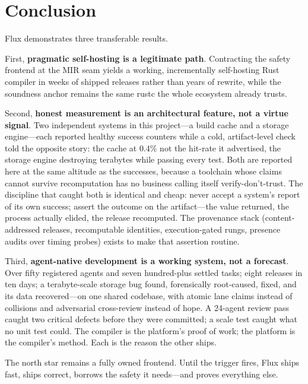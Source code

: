 \section{Conclusion}

Flux demonstrates three transferable results.

First, \textbf{pragmatic self-hosting is a legitimate path}. Contracting the safety frontend at the MIR seam yields a working, incrementally self-hosting Rust compiler in weeks of shipped releases rather than years of rewrite, while the soundness anchor remains the same rustc the whole ecosystem already trusts.

Second, \textbf{honest measurement is an architectural feature, not a virtue signal}. Two independent systems in this project---a build cache and a storage engine---each reported healthy success counters while a cold, artifact-level check told the opposite story: the cache at 0.4\% not the hit-rate it advertised, the storage engine destroying terabytes while passing every test. Both are reported here at the same altitude as the successes, because a toolchain whose claims cannot survive recomputation has no business calling itself verify-don't-trust. The discipline that caught both is identical and cheap: never accept a system's report of its own success; assert the outcome on the artifact---the value returned, the process actually elided, the release recomputed. The provenance stack (content-addressed releases, recomputable identities, execution-gated rungs, presence audits over timing probes) exists to make that assertion routine.

Third, \textbf{agent-native development is a working system, not a forecast}. Over fifty registered agents and seven hundred-plus settled tasks; eight releases in ten days; a terabyte-scale storage bug found, forensically root-caused, fixed, and its data recovered---on one shared codebase, with atomic lane claims instead of collisions and adversarial cross-review instead of hope. A 24-agent review pass caught two critical defects before they were committed; a scale test caught what no unit test could. The compiler is the platform's proof of work; the platform is the compiler's method. Each is the reason the other ships.

The north star remains a fully owned frontend. Until the trigger fires, Flux ships fast, ships correct, borrows the safety it needs---and proves everything else.

